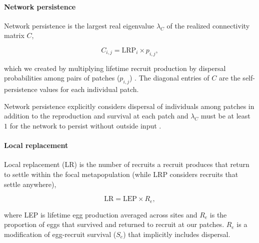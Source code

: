 \documentclass[12pt, oneside]{article}   	%
\begin{document}
\paragraph*{Network persistence}

Network persistence is the largest real eigenvalue $\lambda_C$ of the realized connectivity matrix $C$,


\begin{equation}
C_{i,j} = \text{LRP}_i \times p_{i,j}, \label{EQN_Connectivity_matrix}
\end{equation} 

which we created by multiplying lifetime recruit production by dispersal probabilities among pairs of patches ($p_{i,j}$) \citep{burgess2014beyond}. The diagonal entries of $C$ are the self-persistence values for each individual patch.

Network persistence explicitly considers dispersal of individuals among patches in addition to the reproduction and survival at each patch and $\lambda_C$ must be at least $1$ for the network to persist without outside input \citep{hastings_persistence_2006, white_population_2010, burgess2014beyond}.

\paragraph*{Local replacement}

Local replacement (LR) is the number of recruits a recruit produces that return to settle within the focal metapopulation (while LRP considers recruits that settle anywhere),

\begin{equation}
\text{LR} = \text{LEP} \times R_e, \label{EQN_LR}
\end{equation}

where LEP is lifetime egg production averaged across sites and $R_e$ is the proportion of eggs that survived and returned to recruit at our patches. $R_e$ is a modification of egg-recruit survival ($S_e$) that implicitly includes dispersal. 
\end{document}
